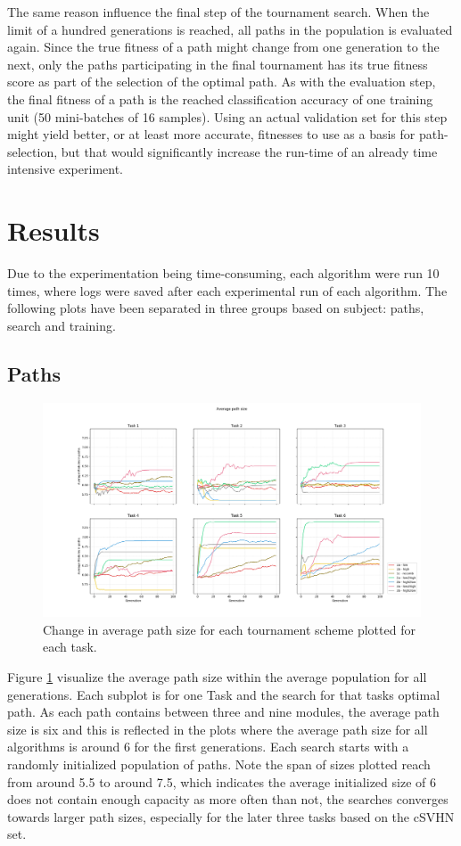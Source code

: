 The same reason influence the final step of the tournament search. When the limit of a hundred generations is reached, all paths in the population is evaluated again. Since the true fitness of a path might change from one generation to the next, only the paths participating in the final tournament has its true fitness score as part of the selection of the optimal path. As with the evaluation step, the final fitness of a path is the reached classification accuracy of one training unit (50 mini-batches of 16 samples). Using an actual validation set for this step might yield better, or at least more accurate, fitnesses to use as a basis for path-selection, but that would significantly increase the run-time of an already time intensive experiment. 

\section{Results}\label{Search-results}
Due to the experimentation being time-consuming, each algorithm were run 10 times, where logs were saved after each experimental run of each algorithm. The following plots have been separated in three groups based on subject: paths, search and training. 

\subsection{Paths}
\begin{figure}[h]
    \includegraphics[width=\textwidth]{Chapters/Experiments/search_algo/figures/Average_path_size.png}
    \caption{Change in average path size for each tournament scheme plotted for each task.}
    \label{fig:search.avg_path_size}
\end{figure}

Figure \ref{fig:search.avg_path_size} visualize the average path size within the average population for all generations. Each subplot is for one Task and the search for that tasks optimal path. As each path contains between three and nine modules, the average path size is six and this is reflected in the plots where the average path size for all algorithms is around 6 for the first generations. Each search starts with a randomly initialized population of paths. Note the span of sizes plotted reach from around 5.5 to around 7.5, which indicates the average initialized size of 6 does not contain enough capacity as more often than not, the searches converges towards larger path sizes, especially for the later three tasks based on the cSVHN set. 

